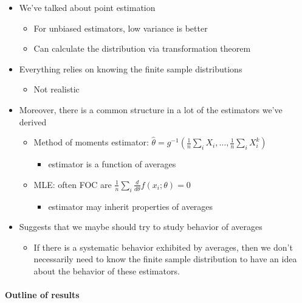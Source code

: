 \begin{itemize}
\item We've talked about point estimation
\begin{itemize}
\item For unbiased estimators, low variance is better
\item Can calculate the distribution via transformation theorem
\end{itemize}
\item Everything relies on knowing the finite sample distributions
\begin{itemize}
\item Not realistic
\end{itemize}
\item Moreover, there is a common structure in a lot of the estimators
       we've derived
\begin{itemize}
\item Method of moments estimator: $\hat\theta =
         g^{-1}(\frac{1}{n}\sum_i X_i, \dots, \frac{1}{n} \sum_i X_i^k)$
\begin{itemize}
\item estimator is a function of averages
\end{itemize}
\item MLE: often FOC are $\frac{1}{n} \sum_i \frac{d}{d\theta}
         f(x_i; \theta) = 0$
\begin{itemize}
\item estimator may inherit properties of averages
\end{itemize}
\end{itemize}
\item Suggests that we maybe should try to study behavior of averages
\begin{itemize}
\item If there is a systematic behavior exhibited by averages, then
         we don't necessarily need to know the finite sample
         distribution to have an idea about the behavior of these estimators.
\end{itemize}
\end{itemize}
\paragraph{Outline of results}
\label{sec-1-1-1}


